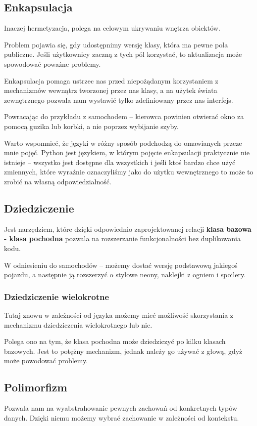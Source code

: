 \subsection{Enkapsulacja}
Inaczej hermetyzacja, polega na celowym ukrywaniu wnętrza obiektów.

Problem pojawia się, gdy udostępnimy wersję klasy, która ma pewne pola publiczne.
Jeśli użytkownicy zaczną z tych pól korzystać, to aktualizacja może spowodować poważne problemy.

Enkapsulacja pomaga ustrzec nas przed niepożądanym korzystaniem z mechanizmów wewnątrz tworzonej przez nas klasy, a na użytek świata zewnętrznego pozwala nam wystawić tylko zdefiniowany przez nas interfejs.

Powracając do przykładu z samochodem -- kierowca powinien otwierać okno za pomocą guzika lub korbki, a nie poprzez wybijanie szyby.

Warto wspomnieć, że języki w różny sposób podchodzą do omawianych przeze mnie pojęć.
Python jest językiem, w którym pojęcie enkapsulacji praktycznie nie istnieje -- wszystko jest dostępne dla wszystkich i jeśli ktoś bardzo chce użyć zmiennych, które wyraźnie oznaczyliśmy jako do użytku wewnętrznego to może to zrobić na własną odpowiedzialność.

\subsection{Dziedziczenie}
Jest narzędziem, które dzięki odpowiednio zaprojektowanej relacji \textbf{klasa bazowa - klasa pochodna} pozwala na rozszerzanie funkcjonalności bez duplikowania kodu.

W odniesieniu do samochodów -- możemy dostać wersję podstawową jakiegoś pojazdu, a następnie ją rozszerzyć o stylowe neony, naklejki z ogniem i spoilery.

\subsubsection{Dziedziczenie wielokrotne}
Tutaj znowu w zależności od języka możemy mieć możliwość skorzystania z mechanizmu dziedziczenia wielokrotnego lub nie.

Polega ono na tym, że klasa pochodna może dziedziczyć po kilku klasach bazowych.
Jest to potężny mechanizm, jednak należy go używać z głową, gdyż może powodować problemy.

\subsection{Polimorfizm}
Pozwala nam na wyabstrahowanie pewnych zachowań od konkretnych typów danych. Dzięki niemu możemy wybrać zachowanie w zależności od kontekstu.

